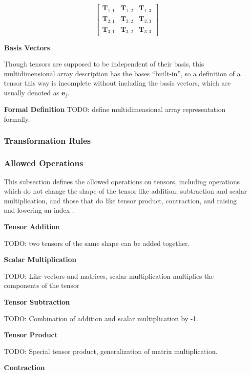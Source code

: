 \documentclass[12pt]{article}
\begin{document}
$$\begin{bmatrix}
  \mathbf T_{1,1} & \mathbf T_{1,2} & \mathbf T_{1,3}\\
  \mathbf T_{2,1} & \mathbf T_{2,2} & \mathbf T_{2,3}\\
  \mathbf T_{3,1} & \mathbf T_{3,2} & \mathbf T_{3,3}
\end{bmatrix}
$$


\medskip
\noindent\textbf{Basis Vectors}

Though tensors are supposed to be independent of their basis, this multidimensional
array description has the bases ``built-in'', so a definition of a tensor this
way is incomplete without including the basis vectors, which are usually denoted
as $\mathbf e_j$.

\noindent\textbf{Formal Definition}
TODO: define multidimensional array representation formally.

\subsubsection{Transformation Rules}

\subsubsection{Allowed Operations}
This subsection defines the allowed operations on tensors, including operations which
do not change the shape of the tensor like addition, subtraction and scalar multiplication,
and those that do like tensor product, contraction, and raising and lowering an index
\citep{Wikipedia_Tensors_2025}.

\medskip
\noindent\textbf{Tensor Addition}

\noindent TODO: two tensors of the same shape can be added together.

\medskip
\noindent\textbf{Scalar Multiplication}

\noindent TODO: Like vectors and matrices, scalar multiplication multiplies the components 
of the tensor

\medskip
\noindent\textbf{Tensor Subtraction}

\noindent TODO: Combination of addition and scalar multiplication by -1.

\medskip
\noindent\textbf{Tensor Product}

\noindent TODO: Special tensor product, generalization of matrix multiplication.

\medskip
\noindent\textbf{Contraction}
\end{document}
